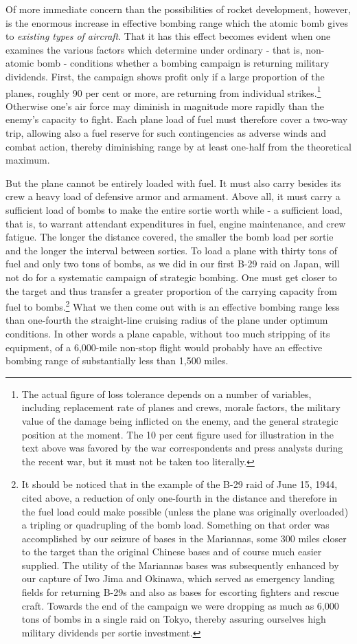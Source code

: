 Of more immediate concern than the possibilities of rocket development, however, is the enormous increase in effective bombing range which the atomic bomb gives to \emph{existing types of aircraft}. That it has this effect becomes evident when one examines the various factors which determine under ordinary - that is, non-atomic bomb - conditions whether a bombing campaign is returning military dividends. First, the campaign shows profit only if a large proportion of the planes, roughly 90 per cent or more, are returning from individual strikes.\footnote{The actual figure of loss tolerance depends on a number of variables, including replacement rate of planes and crews, morale factors, the military value of the damage being inflicted on the enemy, and the general strategic position at the moment. The 10 per cent figure used for illustration in the text above was favored by the war correspondents and press analysts during the recent war, but it must not be taken too literally.} Otherwise one's air force may diminish in magnitude more rapidly than the enemy's capacity to fight. Each plane load of fuel must therefore cover a two-way trip, allowing also a fuel reserve for such contingencies as adverse winds and combat action, thereby diminishing range by at least one-half from the theoretical maximum.

But the plane cannot be entirely loaded with fuel. It must also carry besides its crew a heavy load of defensive armor and armament. Above all, it must carry a sufficient load of bombs to make the entire sortie worth while - a sufficient load, that is, to warrant attendant expenditures in fuel, engine maintenance, and crew fatigue. The longer the distance covered, the smaller the bomb load per sortie and the longer the interval between sorties. To load a plane with thirty tons of fuel and only two tons of bombs, as we did in our first B-29 raid on Japan, will not do for a systematic campaign of strategic bombing. One must get closer to the target and thus transfer a greater proportion of the carrying capacity from fuel to bombs.\footnote{It should be noticed that in the example of the B-29 raid of June 15, 1944, cited above, a reduction of only one-fourth in the distance and therefore in the fuel load could make possible (unless the plane was originally overloaded) a tripling or quadrupling of the bomb load. Something on that order was accomplished by our seizure of bases in the Mariannas, some 300 miles closer to the target than the original Chinese bases and of course much easier supplied. The utility of the Mariannas bases was subsequently enhanced by our capture of Iwo Jima and Okinawa, which served as emergency landing fields for returning B-29s and also as bases for escorting fighters and rescue craft. Towards the end of the campaign we were dropping as much as 6,000 tons of bombs in a single raid on Tokyo, thereby assuring ourselves high military dividends per sortie investment.} What we then come out with is an effective bombing range less than one-fourth the straight-line cruising radius of the plane under optimum conditions. In other words a plane capable, without too much stripping of its equipment, of a 6,000-mile non-stop flight would probably have an effective bombing range of substantially less than 1,500 miles.


